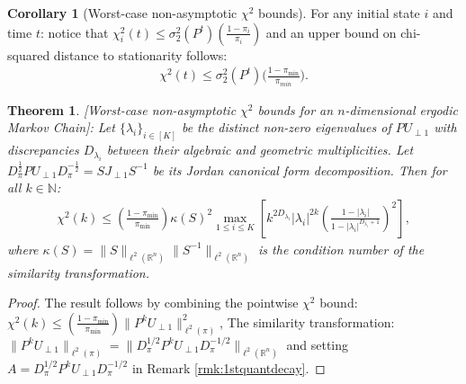 \documentclass[preprint]{imsart}
\theoremstyle{plain}
\newtheorem{theorem}{Theorem}[section]
\theoremstyle{definition}
\newtheorem{corollary}{Corollary}
\begin{document}
\begin{corollary}[Worst-case non-asymptotic $\chi^2$ bounds]
    \label{corr:submcorr}
    For any initial state $i$ and time $t$: notice that $\chi_{i}^{2}(t) \leq \sigma_{2}^{2}(P^{t})\left(\frac{1-\pi_{i}}{\pi_{i}}\right)$ and an upper bound on chi-squared distance to stationarity follows:
    \begin{align}
        \label{eq:chi_square_ubd_non_asymp}
      \chi^{2}(t) \leq \sigma_{2}^{2}(P^{t})\bigg(\frac{1-\pi_{\min}}{\pi_{min}}\bigg).        
    \end{align}
\end{corollary}    
\begin{theorem}
    \label{thm:asymp_conv_chi}
    [Worst-case non-asymptotic $\chi^2$ bounds for an $n$-dimensional ergodic Markov Chain]: Let $\{\lambda_{i}\}_{i \in [K]}$ be the distinct non-zero eigenvalues of $PU_{\perp1}$ with discrepancies $D_{\lambda_{i}}$ between their algebraic and geometric multiplicities. Let $D_{\pi}^{\frac{1}{2}}PU_{\perp1}D_{\pi}^{-\frac{1}{2}}=SJ_{\perp1}S^{-1}$ be its Jordan canonical form decomposition. Then for all $k \in \mathbb{N}$:
    \begin{align}
        \chi^{2}(k) \leq \left(\frac{1-\pi_{\min}}{\pi_{\min}}\right) \kappa(S)^2 \max_{1 \leq i \leq K} \left[ k^{2D_{\lambda_{i}}} |\lambda_{i}|^{2k} \left( \frac{1-|\lambda_{i}|}{1-|\lambda_{i}|^{D_{\lambda_{i}}+1}}\right)^{2} \right],
    \end{align}
    where $\kappa(S) = \|S\|_{\ell^{2}(\mathbb{R}^{n})}\|S^{-1}\|_{\ell^{2}(\mathbb{R}^{n})}$ is the condition number of the similarity transformation.
\end{theorem}
\begin{proof}
The result follows by combining the pointwise $\chi^2$ bound: $\chi^2(k) \leq \left(\frac{1-\pi_{\min}}{\pi_{\min}}\right) \|P^k U_{\perp 1}\|_{\ell^2(\pi)}^2$, The similarity transformation: $\|P^k U_{\perp 1}\|_{\ell^2(\pi)} = \|D_{\pi}^{1/2} P^k U_{\perp 1} D_{\pi}^{-1/2}\|_{\ell^2(\mathbb{R}^n)}$ and setting $A=D_{\pi}^{1/2} P^k U_{\perp 1} D_{\pi}^{-1/2}$ in Remark \ref{rmk:1stquantdecay}.
\end{proof}
\end{document}
